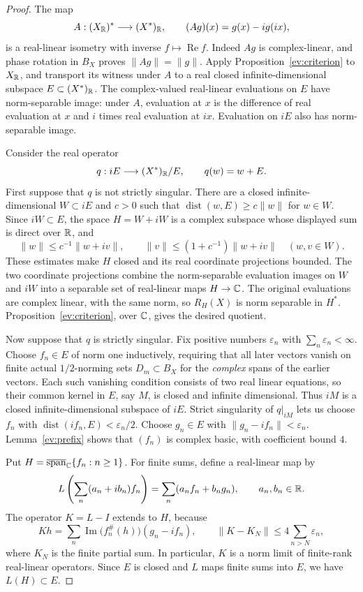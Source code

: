 \begin{proof}
The map
\[
 A:(X_{\mathbb R})^*\longrightarrow (X^*)_{\mathbb R},\qquad
 (Ag)(x)=g(x)-i g(ix),
\]
is a real-linear isometry with inverse $f\mapsto\operatorname{Re}f$.
Indeed $Ag$ is complex-linear, and phase rotation in $B_X$ proves
$\|Ag\|=\|g\|$.
Apply Proposition~\ref{ev:criterion} to $X_{\mathbb R}$, and transport its
witness under $A$ to a real closed infinite-dimensional subspace
$E\subset (X^*)_{\mathbb R}$.  The complex-valued real-linear evaluations on
$E$ have norm-separable image: under $A$, evaluation at $x$ is the
difference of real evaluation at $x$ and $i$ times real evaluation at
$ix$.  Evaluation on $iE$ also has norm-separable image.

Consider the real operator
\[
 q:iE\longrightarrow (X^*)_{\mathbb R}/E,\qquad q(w)=w+E.
\]
First suppose that $q$ is not strictly singular.  There are a closed
infinite-dimensional $W\subset iE$ and $c>0$ such that
$\operatorname{dist}(w,E)\ge c\|w\|$ for $w\in W$.
Since $iW\subset E$, the space $H=W+iW$ is a complex subspace whose
displayed sum is direct over $\mathbb R$, and
\[
 \|w\|\le c^{-1}\|w+iv\|,\qquad
 \|v\|\le(1+c^{-1})\|w+iv\|\quad(w,v\in W).
\]
These estimates make $H$ closed and its real coordinate projections
bounded. The two coordinate projections combine the norm-separable
evaluation images on $W$ and $iW$ into a separable set of real-linear
maps $H\to\mathbb C$. The original evaluations are complex linear, with
the same norm, so $R_H(X)$ is norm separable in $H^*$.
Proposition~\ref{ev:criterion}, over
$\mathbb C$, gives the desired quotient.

Now suppose that $q$ is strictly singular.  Fix positive numbers
$\varepsilon_n$ with $\sum_n\varepsilon_n<\infty$.
Choose $f_n\in E$ of norm one inductively, requiring that all later
vectors vanish on finite actual $1/2$-norming sets $D_m\subset B_X$ for
the \emph{complex} spans of the earlier vectors.  Each such vanishing
condition consists of two real linear equations, so their common kernel
in $E$, say $M$, is closed and infinite dimensional. Thus $iM$ is
a closed infinite-dimensional subspace of $iE$. Strict singularity of
$q|_{iM}$ lets us choose $f_n$ with
$\operatorname{dist}(if_n,E)<\varepsilon_n/2$.
Choose $g_n\in E$ with $\|g_n-if_n\|<\varepsilon_n$.
Lemma~\ref{ev:prefix} shows that $(f_n)$ is complex basic, with
coefficient bound $4$.

Put $H=\overline{\operatorname{span}}_{\mathbb C}\{f_n:n\ge1\}$.
For finite sums, define a real-linear map by
\[
 L\left(\sum_n(a_n+ib_n)f_n\right)
       =\sum_n(a_nf_n+b_ng_n),\qquad a_n,b_n\in\mathbb R.
\]
The operator $K=L-I$ extends to $H$, because
\[
 Kh=\sum_n\operatorname{Im}\bigl(f_n^\#(h)\bigr)(g_n-if_n),
 \qquad
 \|K-K_N\|\le4\sum_{n>N}\varepsilon_n,
\]
where $K_N$ is the finite partial sum.  In particular, $K$ is a norm
limit of finite-rank real-linear operators.  Since $E$ is closed and
$L$ maps finite sums into $E$, we have $L(H)\subset E$.


\end{proof}
